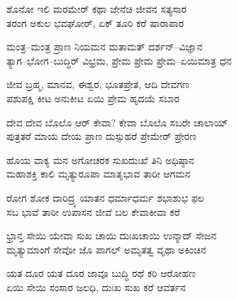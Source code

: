 
\begin{myquote}
ಶೊನೋ ಇಲಿ ಮರಮೇರ್ ಕಥಾ ಜೇನೆಚಿ ಜೀವನ ಸತ್ಯಸಾರ\\ತರಂಗ ಅಕುಲ ಭವಘೋರ್, ಏಕ್ ತೂರಿ ಕರೆ ಷಾರಾಪಾರ
\end{myquote}


\begin{myquote}
ಮಂತ್ರ–ಮಂತ್ರ ಪ್ರಾಣ ನಿಯಮನ ಮತಾಮತ್ ದರ್ಶನ್–ವಿಜ್ಞಾನ\\ತ್ಯಾಗ–ಭೋಗ–ಬುದ್ಧಿ‌ರ್ ವಿಭ್ರಮ, ಪ್ರೇಮ ಪ್ರೇಮ ಪ್ರೇಮ–ಏಯಿಮಾತ್ರ ಧನ
\end{myquote}


\begin{myquote}
ಜೀವ ಬ್ರಹ್ಮ, ಮಾನವ, ಈಶ್ವರ, ಭೂತಪ್ರೇತ, ಆದಿ ದೇವಗಣ\\ಪಶುಪಕ್ಷಿ ಕೀಟ ಅನುಕೀಟ ಏಯಿ ಪ್ರೇಮ ಹೃದಯೆ ಸಬಾರ
\end{myquote}


\begin{myquote}
ದೇವ ದೇವ ಬೊಲೊ ಆರ್ ಕೇವಾ? ಕೇವಾ ಬೊಲೊ ಸಬರೇ ಚಾಲಾಯ್\\ಪುತ್ರತರೆ ಮಾಯ ದೇಯ ಪ್ರಾಣ ದುಸ್ಸುಹರೆ ಪ್ರೇಮೇರ್‌ ಪ್ರೇರಣ
\end{myquote}


\begin{myquote}
ಹೊಯ ವಾಕ್ಯ ಮನ ಅಗೋಚರಕ ಸುಖದುಃಖೆ ತಿನಿ ಅಧಿಷ್ಠಾನ\\ಮಹಾಶಕ್ತಿ ಕಾಲಿ ಮೃತ್ಯುರೂಪಾ ಮಾತೃಭಾವ ತಾರೀ ಆಗಮನ
\end{myquote}


\begin{myquote}
ರೋಗ ಶೋಕ ದಾರಿದ್ರ್ಯ ಯಾತನ ಧರ್ಮಾಧರ್ಮ ಶಭಾಶುಭ ಫಲ\\ಸಬ ಭಾವೆ ತಾರೀ ಉಪಾಸನ ಜೀವೆ ಬಲ ಕೇವಾಕೀವಾ ಕರೆ
\end{myquote}


\begin{myquote}
ಭ್ರಾನ್ತ ಸೇಯಿ ಯೇವಾ ಸುಖ ಚಾಯಿ ದುಃಖಚಾಯಿ ಉನ್ಮಾದ್ ಸೇಜನ\\ಮೃತ್ಯುಮಾಂಗೆ ಸೇವೋ ಜೊ ಪಾಗಲ್ ಅಮೃತತ್ವ ವೃಥಾ ಅಕಿಂಚಿನ
\end{myquote}


\begin{myquote}
ಯತ ದೂರ ಯತ ದೂರ ಜಾವೂ ಬುದ್ಧಿ ರಥೆ ಕರಿ ಆರೋಹಣ\\ಏಯಿ ಸೇಯಿ ಸಂಸಾರ ಜಲಧಿ, ದುಃಖ ಸುಖ ಕರೆ ಆವರ್ತನ
\end{myquote}

